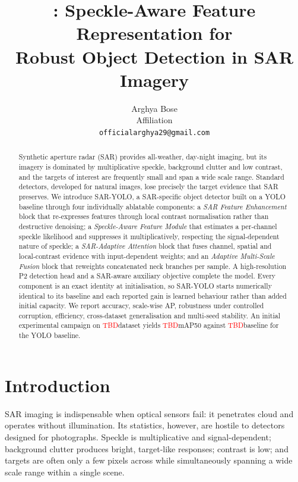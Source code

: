 \documentclass[10pt,twocolumn,letterpaper]{article}
\title{\ours: Speckle-Aware Feature Representation for\\
Robust Object Detection in SAR Imagery}
\author{Arghya Bose\\
\small Affiliation\\
\small \texttt{officialarghya29@gmail.com}
}
\newcommand{\tbd}{\textcolor{red}{TBD}}
\newcommand{\ours}{\textsc{SAR-YOLO}}
\begin{document}
\maketitle

\begin{abstract}
Synthetic aperture radar (SAR) provides all-weather, day-night imaging, but its
imagery is dominated by multiplicative speckle, background clutter and low
contrast, and the targets of interest are frequently small and span a wide scale
range. Standard detectors, developed for natural images, lose precisely the
target evidence that SAR preserves.
%
We introduce \ours{}, a SAR-specific object detector built on a YOLO baseline
through four individually ablatable components: a \emph{SAR Feature Enhancement}
block that re-expresses features through local contrast normalisation rather than
destructive denoising; a \emph{Speckle-Aware Feature Module} that estimates a
per-channel speckle likelihood and suppresses it multiplicatively, respecting
the signal-dependent nature of speckle; a \emph{SAR-Adaptive Attention} block
that fuses channel, spatial and local-contrast evidence with input-dependent
weights; and an \emph{Adaptive Multi-Scale Fusion} block that reweights
concatenated neck branches per sample. A high-resolution P2 detection head and a
SAR-aware auxiliary objective complete the model.
%
Every component is an exact identity at initialisation, so \ours{} starts
numerically identical to its baseline and each reported gain is learned
behaviour rather than added initial capacity. We report accuracy, scale-wise AP,
robustness under controlled corruption, efficiency, cross-dataset generalisation
and multi-seed stability.
%
An initial experimental campaign on \tbd{dataset} yields \tbd{mAP50} against
\tbd{baseline} for the YOLO baseline.
\end{abstract}

\section{Introduction}
\label{sec:intro}

SAR imaging is indispensable when optical sensors fail: it penetrates cloud and
operates without illumination. Its statistics, however, are hostile to detectors
designed for photographs. Speckle is multiplicative and signal-dependent;
background clutter produces bright, target-like responses; contrast is low; and
targets are often only a few pixels across while simultaneously spanning a wide
scale range within a single scene.
\end{document}
